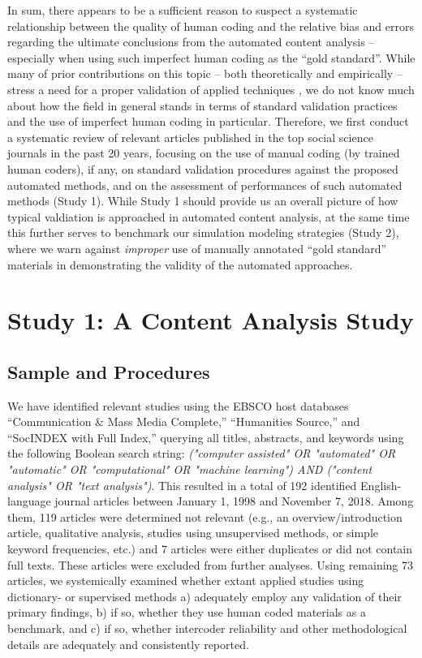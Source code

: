 \documentclass[man, floatsintext, 12pt, a4paper, noextraspace]{apa6}
\begin{document}
    In sum, there appears to be a sufficient reason to suspect a systematic relationship between the quality of human coding and the relative bias and errors regarding the ultimate conclusions from the automated content analysis -- especially when using such imperfect human coding as the ``gold standard''. While many of prior contributions on this topic -- both theoretically and empirically -- stress a need for a proper validation of applied techniques \parencites[e.g.,][]{grimmer2013text, Hopkins_King2010, gonzalez2015signals}, we do not know much about how the field in general stands in terms of standard validation practices and the use of imperfect human coding in particular. Therefore, we first conduct a systematic review of relevant articles published in the top social science journals in the past 20 years, focusing on the use of manual coding (by trained human coders), if any, on standard validation procedures against the proposed automated methods, and on the assessment of performances of such automated methods (Study 1). While Study 1 should provide us an overall picture of how typical valdiation is approached in automated content analysis, at the same time this further serves to benchmark our simulation modeling strategies (Study 2), where we warn against \textit{improper} use of manually annotated \enquote{gold standard} materials in demonstrating the validity of the automated approaches.

\section{Study 1: A Content Analysis Study}

\subsection{Sample and Procedures}

    We have identified relevant studies using the EBSCO host databases “Communication \& Mass Media Complete,” “Humanities Source,” and “SocINDEX with Full Index,” querying all titles, abstracts, and keywords using the following Boolean search string: \textit{("computer assisted" OR "automated" OR "automatic" OR "computational" OR "machine learning") AND ("content analysis" OR "text analysis")}. This resulted in a total of 192 identified English-language journal articles between January 1, 1998 and November 7, 2018. Among them, 119 articles were determined not relevant (e.g., an overview/introduction article, qualitative analysis, studies using unsupervised methods, or simple keyword frequencies, etc.) and 7 articles were either duplicates or did not contain full texts. These articles were excluded from further analyses. Using remaining 73 articles, we systemically examined whether extant applied studies using dictionary- or supervised methods a) adequately employ any validation of their primary findings, b) if so, whether they use human coded materials as a benchmark, and c) if so, whether intercoder reliability and other methodological details are adequately and consistently reported. 
    
\end{document}
